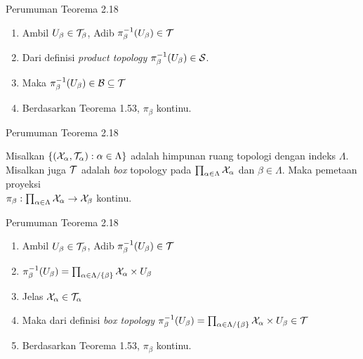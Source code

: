 \begin{frame}{Perumuman Teorema 2.18}
    \begin{tcolorbox}[enhanced,title=Teorema 2.31 (Bukti), frame style tile={width=\paperwidth}{\wallpaper}]
        \begin{enumerate}
            \item Ambil $U_\beta \in \nT_\beta$, Adib $\pi_{\beta}^{-1}(U_\beta)\in\nT$
            \item Dari definisi \textit{product topology} $\pi_{\beta}^{-1}(U_\beta)\in\nS$.
            \item Maka $\pi_{\beta}^{-1}(U_\beta)\in\nB \subseteq \nT$
            \item Berdasarkan Teorema 1.53, $\pi_\beta$ kontinu.
        \end{enumerate}
    \end{tcolorbox}
\end{frame}

\begin{frame}{Perumuman Teorema 2.18}
    \begin{tcolorbox}[enhanced,title=Akibat 2.32, frame style tile={width=\paperwidth}{\wallpaper}]
        Misalkan $\set*{\oio*{\nX_\alpha,\nT_\alpha}:\alpha \in \Lambda}$ adalah himpunan ruang topologi
        dengan indeks $\Lambda$. Misalkan juga $\nT$ adalah \textit{box} topology pada $\prod_{\alpha \in \Lambda}\nX_\alpha$ 
        dan $\beta \in \Lambda$. Maka pemetaan proyeksi \\$\pi_\beta:\prod_{\alpha \in \Lambda}\nX_\alpha \to \nX_\beta$ kontinu.
    \end{tcolorbox}
\end{frame}

\begin{frame}{Perumuman Teorema 2.18}
    \begin{tcolorbox}[enhanced,title=Akibat 2.32 (Bukti), frame style tile={width=\paperwidth}{\wallpaper}]
        \begin{enumerate}
            \item Ambil $U_\beta \in \nT_\beta$, Adib $\pi_{\beta}^{-1}(U_\beta)\in\nT$
            \item $\pi_{\beta}^{-1}(U_\beta) = \prod_{\alpha\in\Lambda/\set{\beta}} \nX_\alpha \times U_{\beta}$
            \item Jelas $\nX_\alpha \in \nT_\alpha$
            \item Maka dari definisi \textit{box topology} $\pi_{\beta}^{-1}(U_\beta) = \prod_{\alpha\in\Lambda/\set{\beta}} \nX_\alpha \times U_{\beta}\in \nT$
            \item Berdasarkan Teorema 1.53, $\pi_\beta$ kontinu.
        \end{enumerate}
    \end{tcolorbox}
\end{frame}

